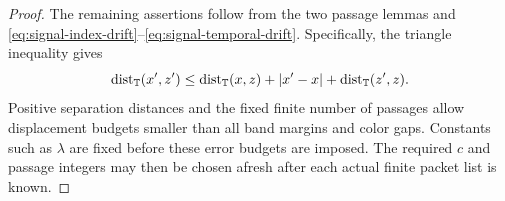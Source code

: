 \begin{proof}
The remaining assertions follow from the two passage lemmas and
\eqref{eq:signal-index-drift}--\eqref{eq:signal-temporal-drift}.
Specifically, the triangle inequality gives
\[
 \operatorname{dist}_\mathbb T(x',z')\le\operatorname{dist}_\mathbb T(x,z)+|x'-x|+\operatorname{dist}_\mathbb T(z',z).
\]
Positive separation distances and the fixed finite number of passages
allow displacement budgets smaller than all band margins and color
gaps.  Constants such as $\lambda$ are fixed before these error budgets
are imposed.  The required $c$ and passage integers may then be chosen
afresh after each actual finite packet list is known.
\end{proof}
